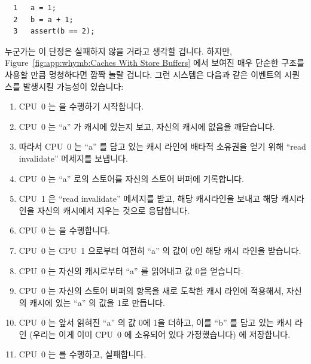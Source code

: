 \vspace{5pt}
\begin{minipage}[t]{\columnwidth}
\small
\begin{verbatim}
  1   a = 1;
  2   b = a + 1;
  3   assert(b == 2);
\end{verbatim}
\end{minipage}
\vspace{5pt}

누군가는 이 단정은 실패하지 않을 거라고 생각할 겁니다.
하지만, Figure~\ref{fig:app:whymb:Caches With Store Buffers} 에서 보여진 매우
단순한 구조를 사용할 만큼 멍청하다면 깜짝 놀랄 겁니다.
그런 시스템은 다음과 같은 이벤트의 시퀀스를 발생시킬 가능성이 있습니다:
\begin{enumerate}
\item	CPU~0 는  을 수행하기 시작합니다.
\item	CPU~0 는 ``a'' 가 캐시에 있는지 보고, 자신의 캐시에 없음을 깨닫습니다.
\item	따라서 CPU~0 는 ``a'' 를 담고 있는 캐시 라인에 배타적 소유권을 얻기
	위해 ``read invalidate'' 메세지를 보냅니다.
\item	CPU~0 는 ``a'' 로의 스토어를 자신의 스토어 버퍼에 기록합니다.
\item	CPU~1 은 ``read invalidate'' 메세지를 받고, 해당 캐시라인을 보내고 해당
	캐시라인을 자신의 캐시에서 지우는 것으로 응답합니다.
\item	CPU~0 는  을 수행합니다.
\item	CPU~0 는 CPU~1 으로부터 여전히 ``a'' 의 값이 0인 해당 캐시 라인을
	받습니다.
\item	CPU~0 는 자신의 캐시로부터 ``a'' 를 읽어내고 값 0을 얻습니다.
	\label{item:app:whymb:Need Store Buffer}
\item	CPU~0 는 자신의 스토어 버퍼의 항목을 새로 도착한 캐시 라인에 적용해서,
	자신의 캐시에 있는 ``a'' 의 값을 1로 만듭니다.
\item	CPU~0 는 앞서 읽혀진 ``a'' 의 값 0에 1을 더하고, 이를 ``b'' 를 담고
	있는 캐시 라인 (우리는 이게 이미 CPU~0 에 소유되어 있다 가정했습니다)
	에 저장합니다.
\item	CPU~0 는  를 수행하고, 실패합니다.
\end{enumerate}
\iffalse

